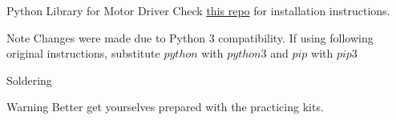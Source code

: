 \documentclass[12pt,letterpaper]{beamer}
\begin{document}
\begin{frame}{Python Library for Motor Driver}
    Check \href{https://github.com/linzhangUCA/dual-mc33926-motor-driver-rpi}{this repo} for installation instructions.
    \begin{block}{Note}
        Changes were made due to Python 3 compatibility. If using following original instructions, substitute $python$ with $python3$ and $pip$ with $pip3$
    \end{block}
\end{frame}

\begin{frame}{Soldering}
    \begin{alertblock}{Warning}
        Better get yourselves prepared with the practicing kits.
    \end{alertblock}
\end{frame}
\end{document}
